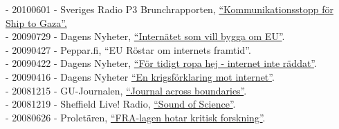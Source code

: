 \documentclass[a4paper,11pt,oneside]{article}
\begin{document}
{    - 20100601 - Sveriges Radio P3 Brunchrapporten, \href{http://t.sr.se/1cnEijY}{``Kommunikationsstopp för Ship to Gaza''.} \\
    - 20090729 - Dagens Nyheter, \href{http://www.dn.se/kultur-noje/nyheter/internatet-som-vill-bygga-om-eu/}{``Internätet som vill bygga om EU''}. \\
    - 20090427 - Peppar.fi, ``EU Röstar om internets framtid''. \\
    - 20090422 - Dagens Nyheter, \href{http://www.dn.se/kultur-noje/musik/for-tidigt-ropa-hej-internet-inte-raddat/}{``För tidigt ropa hej - internet inte räddat''}. \\
    - 20090416 - Dagens Nyheter \href{http://www.dn.se/kultur-noje/en-krigsforklaring-mot-internet/}{``En krigsförklaring mot internet''}. \\
    - 20081215 - GU-Journalen, \href{http://www.gu-journalen.gu.se/english/News/News_detail/?contentId=855527}{``Journal across boundaries''}. \\
    - 20081219 - Sheffield Live! Radio, \href{http://www.dcs.shef.ac.uk/%7Enoel/soundofscience/Prog%2032.mp3}{``Sound of Science''}. \\
    - 20080626 - Proletären, \href{http://www.proletaren.se/inrikes/%E2%80%9Dfra-lagen-hotar-kritisk-forskning}{``FRA-lagen hotar kritisk forskning''}.

}
\end{document}
